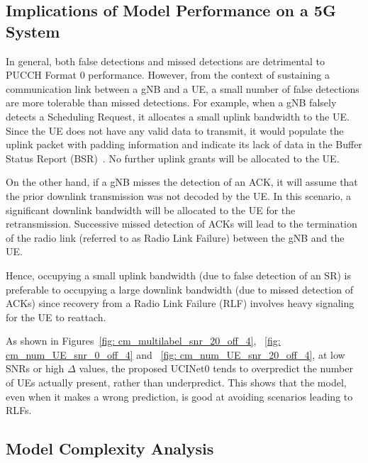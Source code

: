 \documentclass[journal]{IEEEtran}
\begin{document}
\subsection{Implications of Model Performance on a 5G System}
In general, both false detections and missed detections are detrimental to PUCCH Format 0 performance. However, from the context of sustaining a communication link between a gNB and a UE, a small number of false detections are more tolerable than missed detections. For example, when a gNB falsely detects a Scheduling Request, it allocates a small uplink bandwidth to the UE. Since the UE does not have any valid data to transmit, it would populate the uplink packet with padding information and indicate its lack of data in the Buffer Status Report (BSR)~\cite{Lin_2018}. No further uplink grants will be allocated to the UE. 

On the other hand, if a gNB misses the detection of an ACK, it will assume that the prior downlink transmission was not decoded by the UE. In this scenario, a significant downlink bandwidth will be allocated to the UE for the retransmission. Successive missed detection of ACKs will lead to the termination of the radio link (referred to as Radio Link Failure) between the gNB and the UE. 

Hence, occupying a small uplink bandwidth (due to false detection of an SR) is preferable to occupying a large downlink bandwidth (due to missed detection of ACKs) since recovery from a Radio Link Failure (RLF) involves heavy signaling for the UE to reattach. 

As shown in Figures~\ref{fig: cm_multilabel_snr_20_off_4}, ~\ref{fig: cm_num_UE_snr_0_off_4} and ~\ref{fig: cm_num_UE_snr_20_off_4}, at low SNRs or high $\Delta$ values, the proposed UCINet0 tends to overpredict the number of UEs actually present, rather than underpredict. This shows that the model, even when it makes a wrong prediction, is good at avoiding scenarios leading to RLFs. 


\subsection{Model Complexity Analysis}
\end{document}
